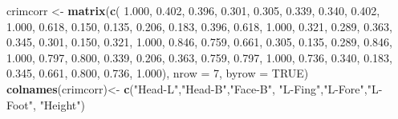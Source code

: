 \documentclass[]{article}
\newenvironment{Shaded}{\begin{snugshade}}{\end{snugshade}}
\newcommand{\DataTypeTok}[1]{\textcolor[rgb]{0.13,0.29,0.53}{#1}}
\newcommand{\DecValTok}[1]{\textcolor[rgb]{0.00,0.00,0.81}{#1}}
\newcommand{\FloatTok}[1]{\textcolor[rgb]{0.00,0.00,0.81}{#1}}
\newcommand{\KeywordTok}[1]{\textcolor[rgb]{0.13,0.29,0.53}{\textbf{#1}}}
\newcommand{\NormalTok}[1]{#1}
\newcommand{\OperatorTok}[1]{\textcolor[rgb]{0.81,0.36,0.00}{\textbf{#1}}}
\newcommand{\OtherTok}[1]{\textcolor[rgb]{0.56,0.35,0.01}{#1}}
\newcommand{\StringTok}[1]{\textcolor[rgb]{0.31,0.60,0.02}{#1}}
\begin{document}
\begin{Shaded}
\begin{Highlighting}[]
\NormalTok{crimcorr <-}\StringTok{ }\KeywordTok{matrix}\NormalTok{(}\KeywordTok{c}\NormalTok{(}
  \FloatTok{1.000}\NormalTok{, }\FloatTok{0.402}\NormalTok{, }\FloatTok{0.396}\NormalTok{, }\FloatTok{0.301}\NormalTok{, }\FloatTok{0.305}\NormalTok{, }\FloatTok{0.339}\NormalTok{, }\FloatTok{0.340}\NormalTok{,}
  \FloatTok{0.402}\NormalTok{, }\FloatTok{1.000}\NormalTok{, }\FloatTok{0.618}\NormalTok{, }\FloatTok{0.150}\NormalTok{, }\FloatTok{0.135}\NormalTok{, }\FloatTok{0.206}\NormalTok{, }\FloatTok{0.183}\NormalTok{,}
  \FloatTok{0.396}\NormalTok{, }\FloatTok{0.618}\NormalTok{, }\FloatTok{1.000}\NormalTok{, }\FloatTok{0.321}\NormalTok{, }\FloatTok{0.289}\NormalTok{, }\FloatTok{0.363}\NormalTok{, }\FloatTok{0.345}\NormalTok{,}
  \FloatTok{0.301}\NormalTok{, }\FloatTok{0.150}\NormalTok{, }\FloatTok{0.321}\NormalTok{, }\FloatTok{1.000}\NormalTok{, }\FloatTok{0.846}\NormalTok{, }\FloatTok{0.759}\NormalTok{, }\FloatTok{0.661}\NormalTok{,}
  \FloatTok{0.305}\NormalTok{, }\FloatTok{0.135}\NormalTok{, }\FloatTok{0.289}\NormalTok{, }\FloatTok{0.846}\NormalTok{, }\FloatTok{1.000}\NormalTok{, }\FloatTok{0.797}\NormalTok{, }\FloatTok{0.800}\NormalTok{,}
  \FloatTok{0.339}\NormalTok{, }\FloatTok{0.206}\NormalTok{, }\FloatTok{0.363}\NormalTok{, }\FloatTok{0.759}\NormalTok{, }\FloatTok{0.797}\NormalTok{, }\FloatTok{1.000}\NormalTok{, }\FloatTok{0.736}\NormalTok{,}
  \FloatTok{0.340}\NormalTok{, }\FloatTok{0.183}\NormalTok{, }\FloatTok{0.345}\NormalTok{, }\FloatTok{0.661}\NormalTok{, }\FloatTok{0.800}\NormalTok{, }\FloatTok{0.736}\NormalTok{, }\FloatTok{1.000}\NormalTok{), }\DataTypeTok{nrow =} \DecValTok{7}\NormalTok{, }\DataTypeTok{byrow =} \OtherTok{TRUE}\NormalTok{)}
\KeywordTok{colnames}\NormalTok{(crimcorr)<-}\StringTok{ }\KeywordTok{c}\NormalTok{(}\StringTok{"Head-L"}\NormalTok{,}\StringTok{"Head-B"}\NormalTok{,}\StringTok{"Face-B"}\NormalTok{,}
                     \StringTok{"L-Fing"}\NormalTok{,}\StringTok{"L-Fore"}\NormalTok{,}\StringTok{"L-Foot"}\NormalTok{, }\StringTok{"Height"}\NormalTok{)}
\end{Highlighting}
\end{Shaded}

\begin{Shaded}
\end{Shaded}
\end{document}
